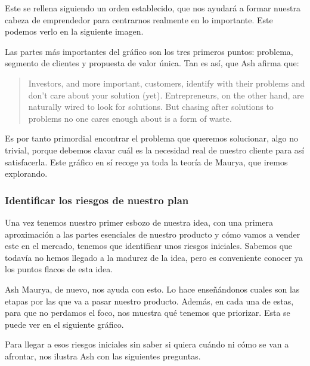 Este se rellena siguiendo un orden establecido, que nos ayudará a formar nuestra cabeza de emprendedor para centrarnos realmente en lo importante. Este podemos verlo en la siguiente imagen.


Las partes más importantes del gráfico son los tres primeros puntos: problema, segmento de clientes y propuesta de valor única. Tan es así, que Ash afirma que:

\begin{quote}
	\small Investors, and more important, customers, identify with their problems and don't care about your solution (yet). Entrepreneurs, on the other hand, are naturally wired to look for solutions. But chasing after solutions to problems no one cares enough about is a form of waste.
	\begin{flushright}
	\end{flushright}
\end{quote}

Es por tanto primordial encontrar el problema que queremos solucionar, algo no trivial, porque debemos clavar cuál es la necesidad real de nuestro cliente para así satisfacerla. Este gráfico en sí recoge ya toda la teoría de Maurya, que iremos explorando.

\subsubsection{Identificar los riesgos de nuestro plan}

Una vez tenemos nuestro primer esbozo de nuestra idea, con una primera aproximación a las partes esenciales de nuestro producto y cómo vamos a vender este en el mercado, tenemos que identificar unos riesgos iniciales. Sabemos que todavía no hemos llegado a la madurez de la idea, pero es conveniente conocer ya los puntos flacos de esta idea.

Ash Maurya, de nuevo, nos ayuda con esto. Lo hace enseñándonos cuales son las etapas por las que va a pasar nuestro producto. Además, en cada una de estas, para que no perdamos el foco, nos muestra qué tenemos que priorizar. Esta se puede ver en el siguiente gráfico.


Para llegar a esos riesgos iniciales sin saber si quiera cuándo ni cómo se van a afrontar, nos ilustra Ash con las siguientes preguntas.

